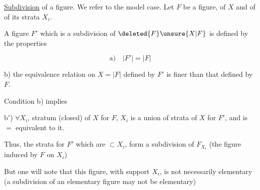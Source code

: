 \uline{Subdivision} of a figure.  We refer to the model case. Let $F$ be a figure,  of $X$ and of  of its strata $X_i$.

A  figure $F'$ which is a subdivision of $\deleted{F}\unsure{X|F}$ is  defined by the properties

\[
\text{a)}\quad |F'|=|F|
\]

b) the equivalence relation on $X=|F|$ defined by $F'$ is finer than that defined by  $F$.

Condition b) implies

b$'$) $\forall X_i$, stratum (closed) of $X$ for $F$, $X_i$ is a union of strata of $X$ for $F'$,  and  is $=$ equivalent to it.

Thus, the strata for $F'$ which are $\subset X_i$, form a  subdivision of $F_{X_i}$ (the  figure induced by $F$ on $X_i$)

But one will note that this figure, with support $X_i$, is not necessarily elementary (a subdivision of an elementary figure may not be elementary)
